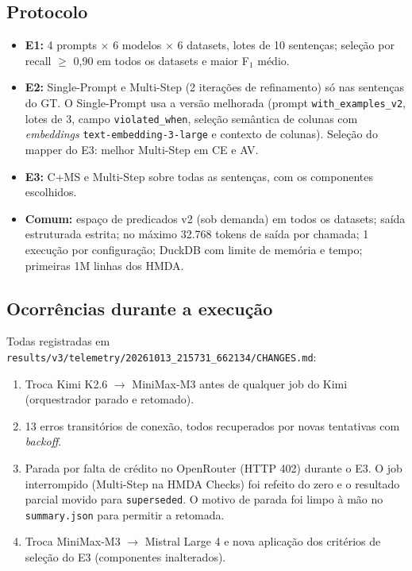 \documentclass[11pt,a4paper]{article}
\begin{document}
\subsection{Protocolo}

\begin{itemize}
  \item \textbf{E1:} 4 prompts $\times$ 6 modelos $\times$ 6 datasets, lotes de 10 sentenças; seleção por
        recall $\geq$ 0,90 em todos os datasets e maior F$_1$ médio.
  \item \textbf{E2:} Single-Prompt e Multi-Step (2 iterações de refinamento) só nas sentenças do GT. O
        Single-Prompt usa a versão melhorada (prompt \texttt{with\_examples\_v2}, lotes de 3, campo
        \texttt{violated\_when}, seleção semântica de colunas com \emph{embeddings} \texttt{text-embedding-3-large}
        e contexto de colunas). Seleção do mapper do E3: melhor Multi-Step em CE e AV.
  \item \textbf{E3:} C+MS e Multi-Step sobre todas as sentenças, com os componentes escolhidos.
  \item \textbf{Comum:} espaço de predicados v2 (sob demanda) em todos os datasets; saída estruturada estrita;
        no máximo 32.768 tokens de saída por chamada; 1 execução por configuração; DuckDB com limite de
        memória e tempo; primeiras 1M linhas dos HMDA.
\end{itemize}

\subsection{Ocorrências durante a execução}

Todas registradas em \texttt{results/v3/telemetry/20261013\_215731\_662134/CHANGES.md}:
\begin{enumerate}
  \item Troca Kimi K2.6 $\rightarrow$ MiniMax-M3 antes de qualquer job do Kimi (orquestrador parado e retomado).
  \item 13 erros transitórios de conexão, todos recuperados por novas tentativas com \emph{backoff}.
  \item Parada por falta de crédito no OpenRouter (HTTP 402) durante o E3. O job interrompido (Multi-Step na
        HMDA Checks) foi refeito do zero e o resultado parcial movido para \texttt{superseded}. O motivo de parada
        foi limpo à mão no \texttt{summary.json} para permitir a retomada.
  \item Troca MiniMax-M3 $\rightarrow$ Mistral Large 4 e nova aplicação dos critérios de seleção do E3
        (componentes inalterados).
\end{enumerate}
\end{document}
